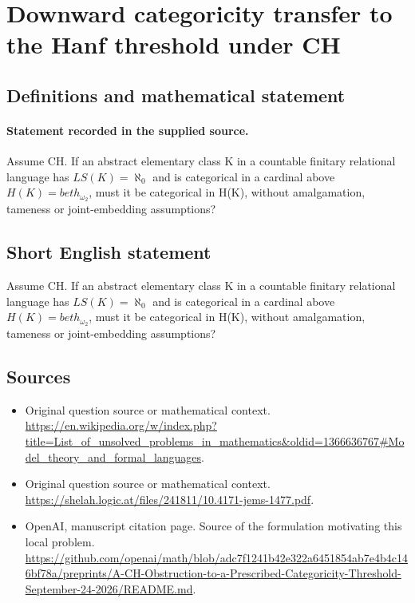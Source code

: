 \documentclass[11pt]{article}
\begin{document}
\section*{Downward categoricity transfer to the Hanf threshold under CH}\label{statement}
\subsection{Definitions and mathematical statement}
\paragraph{Statement recorded in the supplied source.}
Assume CH. If an abstract elementary class K in a countable finitary relational language has $LS(K)=\aleph _{0}$ and is categorical in a cardinal above $H(K)=beth_{\omega _{2}}$, must it be categorical in H(K), without amalgamation, tameness or joint-embedding assumptions?
\subsection{Short English statement}
Assume CH. If an abstract elementary class K in a countable finitary relational language has $LS(K)=\aleph _{0}$ and is categorical in a cardinal above $H(K)=beth_{\omega _{2}}$, must it be categorical in H(K), without amalgamation, tameness or joint-embedding assumptions?
\subsection{Sources}
\begin{itemize}
\item[S1] Original question source or mathematical context.
\url{https://en.wikipedia.org/w/index.php?title=List_of_unsolved_problems_in_mathematics&oldid=1366636767#Model_theory_and_formal_languages}.
\item[S2] Original question source or mathematical context.
\url{https://shelah.logic.at/files/241811/10.4171-jems-1477.pdf}.
\item[S3] OpenAI, manuscript citation page. Source of the formulation motivating this local problem.
\url{https://github.com/openai/math/blob/adc7f1241b42e322a6451854ab7e4b4c146bf78a/preprints/A-CH-Obstruction-to-a-Prescribed-Categoricity-Threshold-September-24-2026/README.md}.
\end{itemize}
\end{document}
